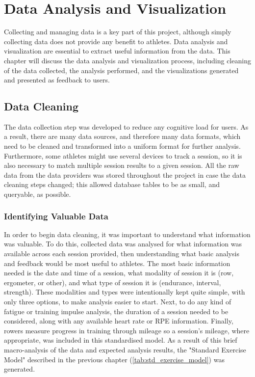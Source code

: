 \chapter{\label{ch:data-anyl-viz}Data Analysis and Visualization}
Collecting and managing data is a key part of this project, although simply collecting data does not provide any benefit to athletes. Data analysis and visualization are essential to extract useful information from the data. This chapter will discuss the data analysis and visualization process, including cleaning of the data collected, the analysis performed, and the visualizations generated and presented as feedback to users.

\section{\label{sec:data-cleaning}Data Cleaning}
The data collection step was developed to reduce any cognitive load for users. As a result, there are many data sources, and therefore many data formats, which need to be cleaned and transformed into a uniform format for further analysis. Furthermore, some athletes might use several devices to track a session, so it is also necessary to match multiple session results to a given session. All the raw data from the data providers was stored throughout the project in case the data cleaning steps changed; this allowed database tables to be as small, and queryable, as possible.
\subsection{Identifying Valuable Data}
In order to begin data cleaning, it was important to understand what information was valuable. To do this, collected data was analysed for what information was available across each session provided, then understanding what basic analysis and feedback would be most useful to athletes. The most basic information needed is the date and time of a session, what modality of session it is (row, ergometer, or other), and what type of session it is (endurance, interval, strength). These modalities and types were intentionally kept quite simple, with only three options, to make analysis easier to start. Next, to do any kind of fatigue or training impulse analysis, the duration of a session needed to be considered, along with any available heart rate or RPE information. Finally, rowers measure progress in training through mileage so a session's mileage, where appropriate, was included in this standardised model. As a result of this brief macro-analysis of the data and expected analysis results, the "Standard Exercise Model" described in the previous chapter (\autoref{tab:std_exercise_model}) was generated.

